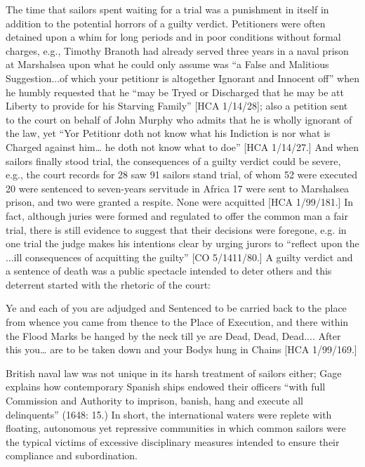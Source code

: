 The time that sailors spent waiting for a trial was a punishment in itself in addition to the potential horrors of a guilty verdict. Petitioners were often detained upon a whim for long periods and in poor conditions without formal charges, e.g., Timothy Branoth had already served three years in a naval prison at Marshalsea upon what he could only assume was “a False and Malitious Suggestion...of which your petitionr is altogether Ignorant and Innocent off” when he humbly requested that he “may be Tryed or Discharged that he may be att Liberty to provide for his Starving Family” [HCA 1/14/28]; also a petition sent to the court on behalf of John Murphy who admits that he is wholly ignorant of the law, yet “Yor Petitionr doth not know what his Indiction is nor what is Charged against him… he doth not know what to doe” [HCA 1/14/27.] And when sailors finally stood trial, the consequences of a guilty verdict could be severe, e.g., the court records for 28 \citealt{March1722} saw 91 sailors stand trial, of whom 52 were executed 20 were sentenced to seven-years servitude in Africa 17 were sent to Marshalsea prison, and two were granted a respite. None were acquitted [HCA 1/99/181.] In fact, although juries were formed and regulated to offer the common man a fair trial, there is still evidence to suggest that their decisions were foregone, e.g. in one trial the judge makes his intentions clear by urging jurors to “reflect upon the ...ill consequences of acquitting the guilty” [CO 5/1411/80.] A guilty verdict and a sentence of death was a public spectacle intended to deter others and this deterrent started with the rhetoric of the court: 

Ye and each of you are adjudged and Sentenced to be carried back to the place from whence you came from thence to the Place of Execution, and there within the Flood Marks be hanged by the neck till ye are Dead, Dead, Dead.... After this you… are to be taken down and your Bodys hung in Chains [HCA 1/99/169.] 

British naval law was not unique in its harsh treatment of sailors either; Gage explains how contemporary Spanish ships endowed their officers “with full Commission and Authority to imprison, banish, hang and execute all delinquents” (1648: 15.) In short, the international waters were replete with floating, autonomous yet repressive communities in which common sailors were the typical victims of excessive disciplinary measures intended to ensure their compliance and subordination. 

